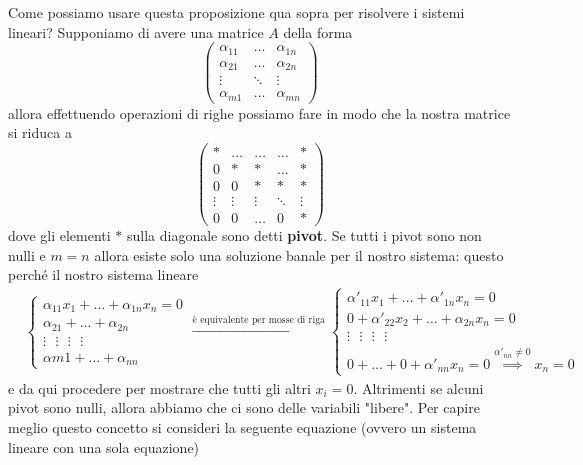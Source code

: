 Come possiamo usare questa proposizione qua sopra per risolvere i sistemi lineari? Supponiamo di avere una matrice $A$ della forma
$$
\begin{pmatrix}
  \alpha_{11} & \ldots & \alpha_{1n} \\
  \alpha_{21} & \ldots & \alpha_{2n} \\
  \vdots & \ddots & \vdots \\
  \alpha_{m1} & \ldots & \alpha_{mn}
\end{pmatrix}
$$
allora effettuendo operazioni di righe possiamo fare in modo che la nostra matrice si riduca a
$$
\begin{pmatrix}
  * & \ldots & \ldots & \ldots & * \\
  0 & * & * & \ldots & * \\
  0 & 0 & * & * & * \\
  \vdots & \vdots & \vdots & \ddots & \vdots \\
  0 & 0 & \ldots & 0 & *
\end{pmatrix}
$$
dove gli elementi $*$ sulla diagonale sono detti \textbf{pivot}. Se tutti i pivot sono non nulli e $m=n$ allora esiste solo una soluzione banale per il nostro sistema: questo perché il nostro sistema lineare
\begin{align}
  &\begin{cases}
    \alpha_{11} x_1 + \ldots + \alpha_{1n} x_n = 0 \\
    \alpha_{21} + \ldots + \alpha_{2n} \\
    \vdots \, \, \, \, \vdots \, \, \, \, \vdots \, \, \, \, \vdots \\
    \alpha{m1} + \ldots + \alpha_{nn}
  \end{cases} \stackrel{\text{è equivalente per mosse di riga}}{\rightarrow} \begin{cases}
    \alpha'_{11} x_1 + \ldots + \alpha'_{1n} x_n = 0 \\
    0 + \alpha'_{22} x_2 + \ldots + \alpha_{2n} x_n = 0 \\
    \vdots \, \, \, \, \vdots \, \, \, \, \vdots \, \, \, \, \vdots \\
    0 + \ldots + 0 + \alpha'_{nn} x_n = 0 \stackrel{\alpha'_{nn} \neq 0}{\implies} x_n = 0
  \end{cases}
\end{align}
e da qui procedere per mostrare che tutti gli altri $x_i = 0$. Altrimenti se alcuni pivot sono nulli, allora abbiamo che ci sono delle variabili "libere". Per capire meglio questo concetto si consideri la seguente equazione (ovvero un sistema lineare con una sola equazione)
